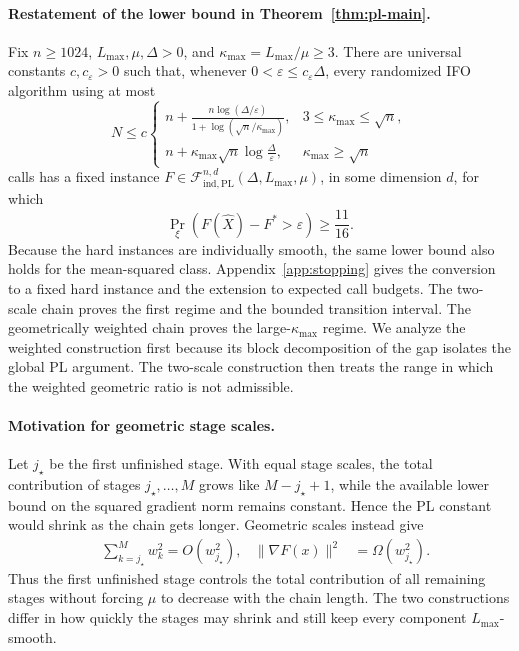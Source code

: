 \documentclass{article}
\theoremstyle{definition}
\begin{document}
\paragraph{Restatement of the lower bound in
Theorem~\ref{thm:pl-main}.}
Fix $n\ge1024$, $L_{\max},\mu,\Delta>0$, and
$\kappa_{\max}=L_{\max}/\mu\ge3$.  There are universal constants
$c,c_\varepsilon>0$ such that, whenever
$0<\varepsilon\le c_\varepsilon\Delta$, every randomized IFO algorithm using at most
\begin{equation}
 N\le c\begin{cases}
 \displaystyle
 n+\frac{n\log(\Delta/\varepsilon)}
 {1+\log(\sqrt n/\kappa_{\max})},
 &3\le\kappa_{\max}\le\sqrt n,\\[2mm]
 \displaystyle
 n+\kappa_{\max}\sqrt n\log\frac{\Delta}{\varepsilon},
 &\kappa_{\max}\ge\sqrt n
 \end{cases}
 \label{eq:restated-pl-lower-budget}
\end{equation}
calls has a fixed instance
$F\in\mathcal F_{\mathrm{ind},\mathrm{PL}}^{n,d}
(\Delta,L_{\max},\mu)$, in some dimension $d$, for which
\begin{equation}
 \Pr_\xi\!\left(F(\widehat X)-F^*>\varepsilon\right)
 \ge\frac{11}{16}.
 \label{eq:restated-pl-lower-failure}
\end{equation}
Because the hard instances are individually smooth, the same lower bound also
holds for the mean-squared class.
Appendix~\ref{app:stopping} gives the conversion to a fixed hard instance and
the extension to expected call budgets.  The two-scale chain proves the first
regime and the bounded transition interval.  The geometrically weighted chain
proves the large-$\kappa_{\max}$ regime.  We analyze the weighted construction
first because its block decomposition of the gap isolates the global PL
argument.  The two-scale construction then treats the range in which the
weighted geometric ratio is not admissible.

\paragraph{Motivation for geometric stage scales.}
Let $j_\star$ be the first unfinished stage.  With equal stage scales, the
total contribution of stages $j_\star,\ldots,M$ grows like
$M-j_\star+1$, while the available lower bound on the squared gradient norm remains
constant.  Hence the PL constant would shrink as the chain gets longer.
Geometric scales instead give
\begin{equation*}
\begin{aligned}
 &\sum_{k=j_\star}^Mw_k^2=O(w_{j_\star}^2),
 &\|\nabla F(x)\|^2&=\Omega(w_{j_\star}^2).
\end{aligned}
\end{equation*}
Thus the first unfinished stage controls the total contribution of all
remaining stages without forcing $\mu$ to decrease with the chain length.  The
two constructions differ in how quickly the stages may shrink and still keep
every component $L_{\max}$-smooth.
\end{document}
